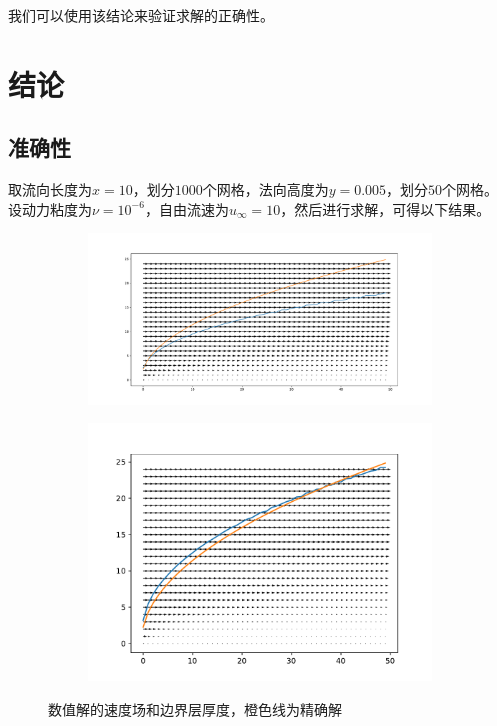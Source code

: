 \documentclass[12pt]{ctexart}
\begin{document}
我们可以使用该结论来验证求解的正确性。

\section{结论}

\subsection{准确性}
取流向长度为$x = 10$，划分$1000$个网格，法向高度为$y = 0.005$，划分$50$个网格。
设动力粘度为$\nu = 10^{-6}$，自由流速为$u_\infty = 10$，然后进行求解，可得以下结果。

\begin{figure}[ht]
    \centering
    \begin{subfigure}{0.4\textwidth}
        \includegraphics[width=\textwidth]{figure/explicit_with_exact_solution}
    \end{subfigure}
    \begin{subfigure}{0.4\textwidth}
        \includegraphics[width=\textwidth]{figure/dufort_with_exact_solution_2_iters}
    \end{subfigure}
    \caption{数值解的速度场和边界层厚度，橙色线为精确解}
\end{figure}
\end{document}
